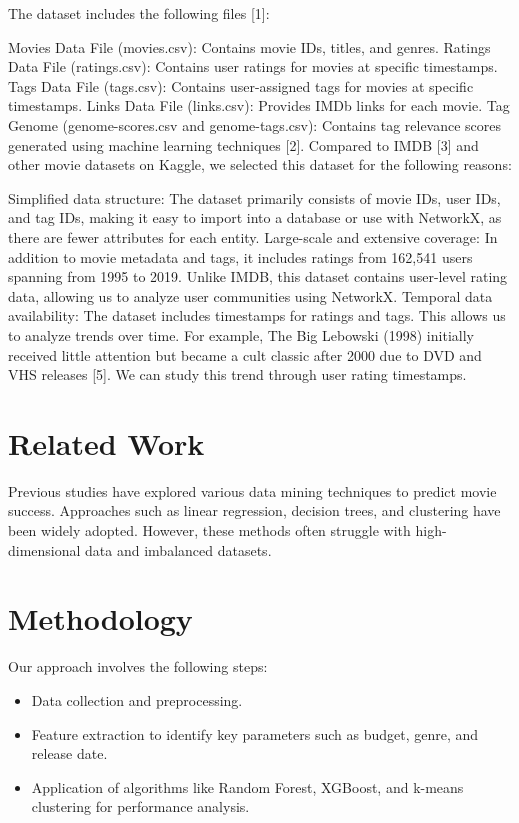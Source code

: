 \documentclass[conference]{IEEEtran}
\begin{document}
The dataset includes the following files [1]:

Movies Data File (movies.csv): Contains movie IDs, titles, and genres.
Ratings Data File (ratings.csv): Contains user ratings for movies at specific timestamps.
Tags Data File (tags.csv): Contains user-assigned tags for movies at specific timestamps.
Links Data File (links.csv): Provides IMDb links for each movie.
Tag Genome (genome-scores.csv and genome-tags.csv): Contains tag relevance scores generated using machine learning techniques [2].
Compared to IMDB [3] and other movie datasets on Kaggle, we selected this dataset for the following reasons:

Simplified data structure: The dataset primarily consists of movie IDs, user IDs, and tag IDs, making it easy to import into a database or use with NetworkX, as there are fewer attributes for each entity.
Large-scale and extensive coverage: In addition to movie metadata and tags, it includes ratings from 162,541 users spanning from 1995 to 2019. Unlike IMDB, this dataset contains user-level rating data, allowing us to analyze user communities using NetworkX.
Temporal data availability: The dataset includes timestamps for ratings and tags. This allows us to analyze trends over time. For example, The Big Lebowski (1998) initially received little attention but became a cult classic after 2000 due to DVD and VHS releases [5]. We can study this trend through user rating timestamps.
\section{Related Work}
Previous studies have explored various data mining techniques to predict movie success. Approaches such as linear regression, decision trees, and clustering have been widely adopted. However, these methods often struggle with high-dimensional data and imbalanced datasets.

\section{Methodology}
Our approach involves the following steps:
\begin{itemize}
    \item Data collection and preprocessing.
    \item Feature extraction to identify key parameters such as budget, genre, and release date.
    \item Application of algorithms like Random Forest, XGBoost, and k-means clustering for performance analysis.
\end{itemize}
\end{document}
